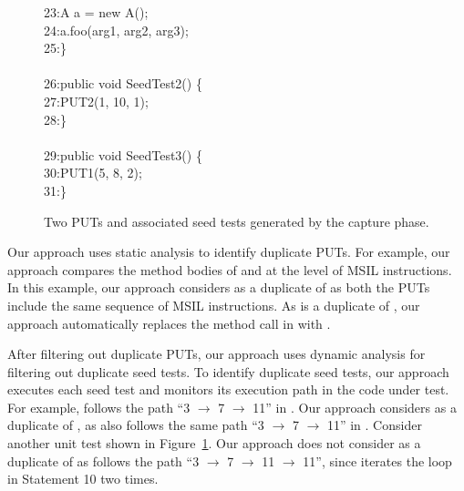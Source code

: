 \begin{figure}[t]
\begin{CodeOut}
23:\hspace*{0.2in}A a = new A();\\
24:\hspace*{0.2in}a.foo(arg1, arg2, arg3);\\
25:\}\\
\\
26:public void SeedTest2() \{\\
27:\hspace*{0.2in}PUT2(1, 10, 1);\\
28:\}\\
\\
29:public void SeedTest3() \{\\
30:\hspace*{0.2in}PUT1(5, 8, 2);\\
31:\}\\
\end{CodeOut}\vspace*{-2ex}
\caption{\label{fig:samplePutAndUT}Two PUTs and associated seed tests generated by the capture phase.}\vspace*{-3ex}
\end{figure}

Our approach uses static analysis to identify duplicate PUTs. For example, our approach compares the method bodies of  and  at the level of MSIL instructions. In this example, our approach considers  as a duplicate of  as both the PUTs include the same sequence of MSIL instructions. As  is a duplicate of , our approach automatically replaces the  method call in  with .

After filtering out duplicate PUTs, our approach uses dynamic analysis for filtering out duplicate seed tests. To identify duplicate seed tests, our approach executes each seed test and monitors its execution path in the code under test. For example,  follows the path ``3 $\rightarrow$ 7 $\rightarrow$ 11'' in . Our approach considers  as a duplicate of , as  also follows the same path ``3 $\rightarrow$ 7 $\rightarrow$ 11'' in . Consider another unit test  shown in Figure~\ref{fig:samplePutAndUT}. Our approach does not consider  as a duplicate of  as  follows the path ``3 $\rightarrow$ 7 $\rightarrow$ 11 $\rightarrow$ 11'', since  iterates the loop in Statement 10 two times.

